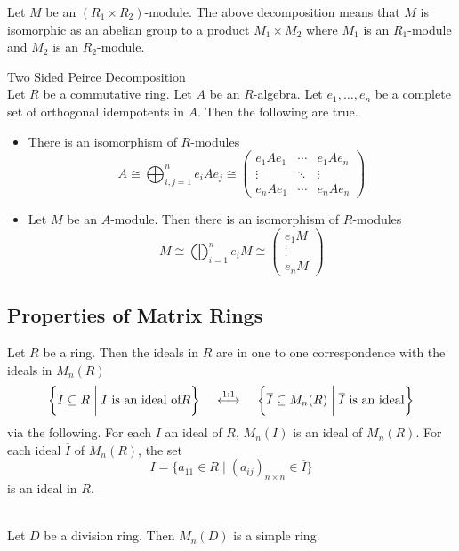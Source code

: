 \documentclass[a4paper]{article}
\begin{document}
Let $M$ be an $(R_1\times R_2)$-module. The above decomposition means that $M$ is isomorphic as an abelian group to a product $M_1\times M_2$ where $M_1$ is an $R_1$-module and $M_2$ is an $R_2$-module. 

\begin{thm}{Two Sided Peirce Decomposition}{}\\
Let $R$ be a commutative ring. Let $A$ be an $R$-algebra. Let $e_1,\dots,e_n$ be a complete set of orthogonal idempotents in $A$. Then the following are true. 
\begin{itemize}
\item There is an isomorphism of $R$-modules $$A\cong\bigoplus_{i,j=1}^ne_iAe_j\cong\begin{pmatrix}
e_1Ae_1 & \cdots & e_1Ae_n\\
\vdots & \ddots & \vdots\\
e_nAe_1 & \cdots & e_nAe_n
\end{pmatrix}$$
\item Let $M$ be an $A$-module. Then there is an isomorphism of $R$-modules $$M\cong\bigoplus_{i=1}^ne_iM\cong\begin{pmatrix}
e_1M\\\vdots\\e_nM
\end{pmatrix}$$
\end{itemize}
\end{thm}

\subsection{Properties of Matrix Rings}
\begin{prp}{}{} Let $R$ be a ring. Then the ideals in $R$ are in one to one correspondence with the ideals in $M_n(R)$ $$\left\{I\subseteq R\;\bigg{|}\;I\text{ is an ideal of} R\right\}\;\;\;\;\overset{1:1}{\longleftrightarrow}\;\;\;\;\left\{\overline{I}\subseteq M_n(R)\;\bigg{|}\;\overline{I}\text{ is an ideal}\right\}$$ via the following. For each $I$ an ideal of $R$, $M_n(I)$ is an ideal of $M_n(R)$. For each ideal $\overline{I}$ of $M_n(R)$, the set $$I=\{a_{11}\in R\;|\;(a_{ij})_{n\times  n}\in\overline{I}\}$$ is an ideal in $R$. 
\end{prp}

\begin{crl}{}{}\\
Let $D$ be a division ring. Then $M_n(D)$ is a simple ring. 
\end{crl}
\end{document}
